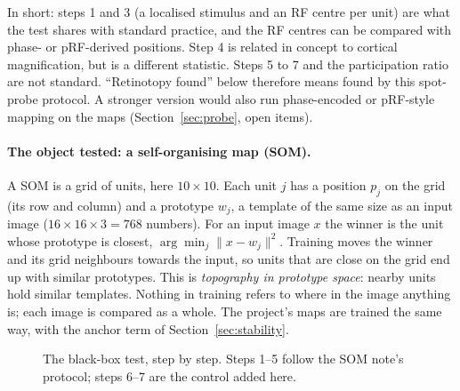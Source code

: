 \documentclass[11pt,a4paper]{article}
\begin{document}
In short: steps 1 and 3 (a localised stimulus and an RF centre per unit) are what the
test shares with standard practice, and the RF centres can be compared with phase- or
pRF-derived positions. Step 4 is related in concept to cortical magnification, but is
a different statistic. Steps 5 to 7 and the participation ratio are not standard.
``Retinotopy found'' below therefore means found by this spot-probe protocol. A
stronger version would also run phase-encoded or pRF-style mapping on the maps
(Section~\ref{sec:probe}, open items).

\paragraph{The object tested: a self-organising map (SOM).} A SOM is a grid of units,
here $10\times10$. Each unit $j$ has a position $p_j$ on the grid (its row and
column) and a prototype $w_j$, a template of the same size as an input image
($16\times16\times3=768$ numbers). For an input image $x$ the winner is the unit
whose prototype is closest, $\arg\min_j\|x-w_j\|^2$. Training moves the winner and its
grid neighbours towards the input, so units that are close on the grid end up with
similar prototypes. This is \emph{topography in prototype space}: nearby units hold
similar templates. Nothing in training refers to where in the image anything is; each
image is compared as a whole. The project's maps are trained the same way, with the
anchor term of Section~\ref{sec:stability}.

\begin{figure}[h]
\centering
{}
\caption{The black-box test, step by step. Steps 1--5 follow the SOM note's protocol;
steps 6--7 are the control added here.}
\label{fig:pipeline}
\end{figure}
\end{document}
